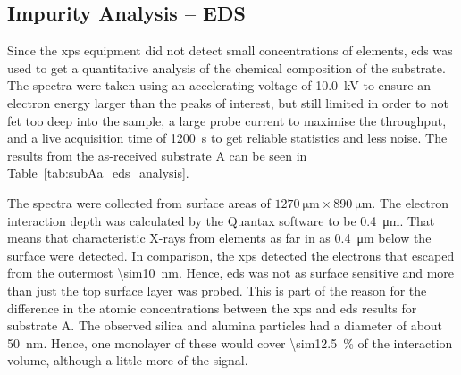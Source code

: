 \subsection{Impurity Analysis -- EDS}
Since the \ac{xps} equipment did not detect small concentrations of elements, \ac{eds} was used to get a quantitative analysis of the chemical composition of the substrate. The spectra were taken using an accelerating voltage of \SI{10.0}{\kilo\volt} to ensure an electron energy larger than the peaks of interest, but still limited in order to not fet too deep into the sample, a large probe current to maximise the throughput, and a live acquisition time of \SI{1200}{\second} to get reliable statistics and less noise. The results from the as-received substrate A can be seen in Table~\ref{tab:subAa_eds_analysis}. %


The spectra were collected from surface areas of $\SI{1270}{\micro\metre}\times\SI{890}{\micro\metre}$. The electron interaction depth was calculated by the Quantax software to be \SI{0.4}{\micro\metre}. That means that characteristic X-rays from elements as far in as \SI{0.4}{\micro\metre} below the surface were detected. In comparison, the \ac{xps} detected the electrons that escaped from the outermost \SI{\sim10}{\nano\metre}. Hence, \ac{eds} was not as surface sensitive and more than just the top surface layer was probed. This is part of the reason for the difference in the atomic concentrations between the \ac{xps} and \ac{eds} results for substrate A. The observed silica and alumina particles had a diameter of about \SI{50}{\nano\metre}. Hence, one monolayer of these would cover \SI{\sim12.5}{\percent} of the interaction volume, although a little more of the signal.

